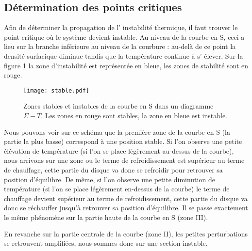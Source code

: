 \subsection{Détermination des points critiques}
Afin de déterminer la propagation de l' instabilité thermique, il faut trouver le point critique où le système devient instable. Au niveau de la courbe en S, ceci a lieu sur la branche inférieure au niveau de la courbure : au-delà de ce point la densité surfacique diminue tandis que la température continue à s' élever. Sur la figure \ref{Fig::stable} la zone d'instabilité est représentée en bleue, les zones de stabilité sont en rouge.

\begin{figure}[htb!]
	\centering
	\texttt{[image: stable.pdf]}
	\caption{Zones stables et instables de la courbe en S dans un diagramme $\Sigma-T$. Les zones en rouge sont stables, la zone en bleue est instable. }
	\label{Fig::stable}
\end{figure}

Nous pouvons voir sur ce schéma que la première zone de la courbe en S (la partie la plus basse) correspond à une position stable. Si l'on observe une petite élévation de température (si l'on se place légèrement au-dessus de la courbe), nous arrivons sur une zone ou le terme de refroidissement est supérieur au terme de chauffage, cette partie du disque va donc se refroidir pour retrouver sa position d'équilibre. De même, si l'on observe une petite diminution de température (si l'on se place légèrement en-dessus de la courbe) le terme de chauffage devient supérieur au terme de refroidissement, cette partie du disque va donc se réchauffer jusqu'à retrouver sa position d'équilibre. Il se passe exactement le même phénomène sur la partie haute de la courbe en S (zone III).

En revanche sur la partie centrale de la courbe (zone II), les petites perturbations se retrouvent amplifiées, nous sommes donc sur une section instable.


